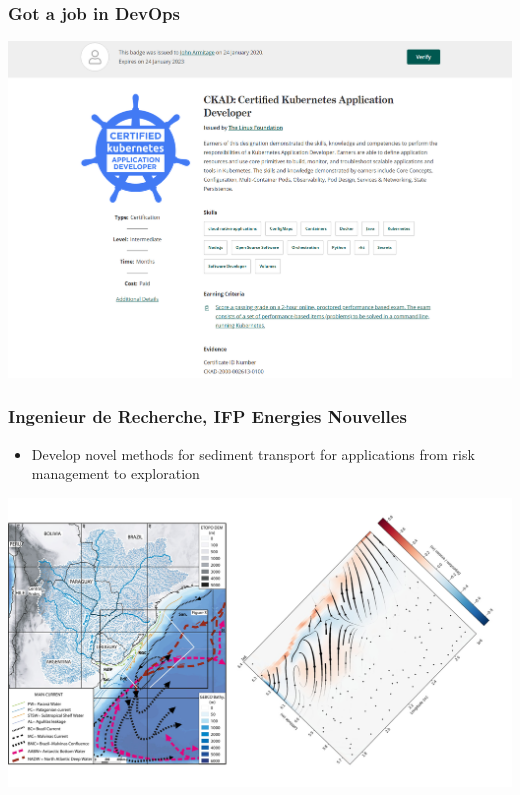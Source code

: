 \documentclass[aspectratio=169]{beamer}
\begin{document}
\begin{frame}
    \frametitle{Got a job in DevOps}
    \centering
    \includegraphics[width=0.7\paperwidth]{./pictures/kubernetes.png}
\end{frame}

\begin{frame}
    \frametitle{Ingenieur de Recherche, IFP Energies Nouvelles}
    \begin{itemize}
        \item{Develop novel methods for sediment transport for applications from risk management to exploration}
    \end{itemize}
    \centering
    \includegraphics[width=0.6\paperwidth]{./pictures/bottom-currents.png}
\end{frame}
\end{document}
